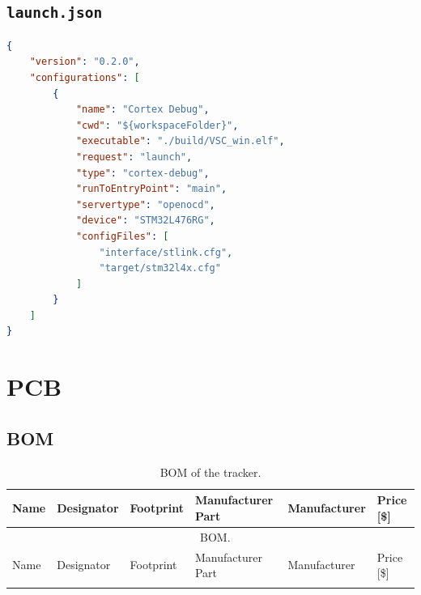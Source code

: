 \begin{appendices}
\subsection*{\lstinline[style=bash]{launch.json}} \label{app:software:launch}
\begin{lstlisting}[language=json]
{
    "version": "0.2.0",
    "configurations": [
        {
            "name": "Cortex Debug",
            "cwd": "${workspaceFolder}",
            "executable": "./build/VSC_win.elf",
            "request": "launch",
            "type": "cortex-debug",
            "runToEntryPoint": "main",
            "servertype": "openocd",
            "device": "STM32L476RG",
            "configFiles": [
                "interface/stlink.cfg",
                "target/stm32l4x.cfg"
            ]
        }
    ]
}
\end{lstlisting}

\section{PCB}

\subsection{BOM} \label{app:BOM}

\begin{footnotesize}
\begin{longtable}{llllll}
    \caption{BOM of the tracker.} \\
    \toprule
    Name & Designator & Footprint & Manufacturer Part & Manufacturer & Price [\$] \\
    \midrule
    \endfirsthead
    
    \multicolumn{6}{c}{\normalsize{\tablename\ \thetable{} BOM.}} \\
    \toprule
    Name & Designator & Footprint & Manufacturer Part & Manufacturer & Price [\$] \\
    \midrule
    \endhead
    
    \endfoot
    
    \endlastfoot


\end{longtable}
\end{footnotesize}
\end{appendices}
